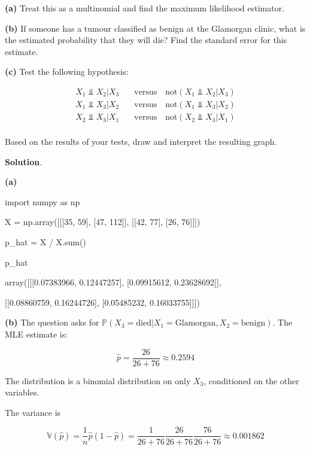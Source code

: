 \textbf{(a)} Treat this as a multinomial and find the maximum likelihood
estimator.

\textbf{(b)} If someone has a tumour classified as benign at the
Glamorgan clinic, what is the estimated probability that they will die?
Find the standard error for this estimate.

\textbf{(c)} Test the following hypothesis:

\begin{align*}
X_{1} \text{ ⫫ } X_{2} |  X_{3} \quad &\text{versus} \quad \text{not} (X_{1} \text{ ⫫ } X_{2} |  X_{3} ) \\
X_{1} \text{ ⫫ } X_{3} |  X_{2} \quad &\text{versus} \quad \text{not} (X_{1} \text{ ⫫ } X_{3} |  X_{2} ) \\
X_{2} \text{ ⫫ } X_{3} |  X_{1} \quad &\text{versus} \quad \text{not} (X_{2} \text{ ⫫ } X_{3} |  X_{1} ) \\
\end{align*}

Based on the results of your tests, draw and interpret the resulting
graph.

\textbf{Solution}.

\textbf{(a)}

\begin{python}
import numpy as np

X = np.array([[[35, 59], [47, 112]], [[42, 77], [26, 76]]])
\end{python}

\begin{python}
p_hat = X / X.sum()

p_hat
\end{python}

\begin{console}
array([[[0.07383966, 0.12447257],
        [0.09915612, 0.23628692]],

       [[0.08860759, 0.16244726],
        [0.05485232, 0.16033755]]])
\end{console}

\textbf{(b)} The question asks for
\(\mathbb{P}( X_{3} = \text{died} | X_{1} = \text{Glamorgan}, X_{2} = \text{benign})\).
The MLE estimate is:

\[\hat{p} = \frac{26}{26 + 76} \approx 0.2594\]

The distribution is a binomial distribution on only \(X_{3}\), conditioned
on the other variables.

The variance is

\[\mathbb{V}(\hat{p}) = \frac{1}{n}\hat{p} (1 - \hat{p}) = \frac{1}{26 + 76} \frac{26}{26 + 76} \frac{76}{26 + 76}  \approx 0.001862\]

